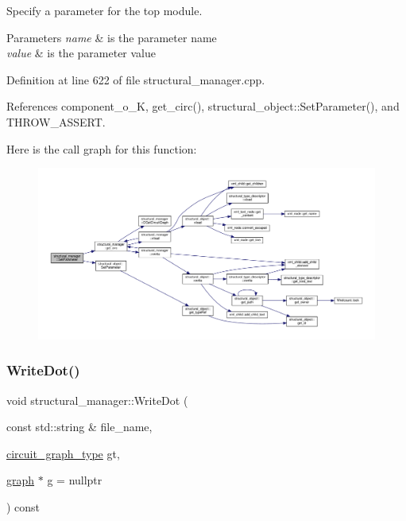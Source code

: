 Specify a parameter for the top module. 


\begin{DoxyParams}{Parameters}
{\em name} & is the parameter name \\
\hline
{\em value} & is the parameter value \\
\hline
\end{DoxyParams}


Definition at line 622 of file structural\+\_\+manager.\+cpp.



References component\+\_\+o\+\_\+K, get\+\_\+circ(), structural\+\_\+object\+::\+Set\+Parameter(), and T\+H\+R\+O\+W\+\_\+\+A\+S\+S\+E\+RT.

Here is the call graph for this function\+:
\nopagebreak
\begin{figure}[H]
\begin{center}
\leavevmode
\includegraphics[width=350pt]{d7/d6b/classstructural__manager_ad35143965dc81c7671ff7bad278add97_cgraph}
\end{center}
\end{figure}
\mbox{\label{classstructural__manager_a8e2dcf5f78cb66140be239eeec3ff762}} 
\subsubsection{\texorpdfstring{Write\+Dot()}{WriteDot()}}
{\footnotesize\ttfamily void structural\+\_\+manager\+::\+Write\+Dot (\begin{DoxyParamCaption}\item[{const std\+::string \&}]{file\+\_\+name,  }\item[{\hyperlink{classstructural__manager_a3ddbeaa6139edd572bbba57042d0a130}{circuit\+\_\+graph\+\_\+type}}]{gt,  }\item[{\hyperlink{structgraph}{graph} $\ast$}]{g = {\ttfamily nullptr} }\end{DoxyParamCaption}) const}



